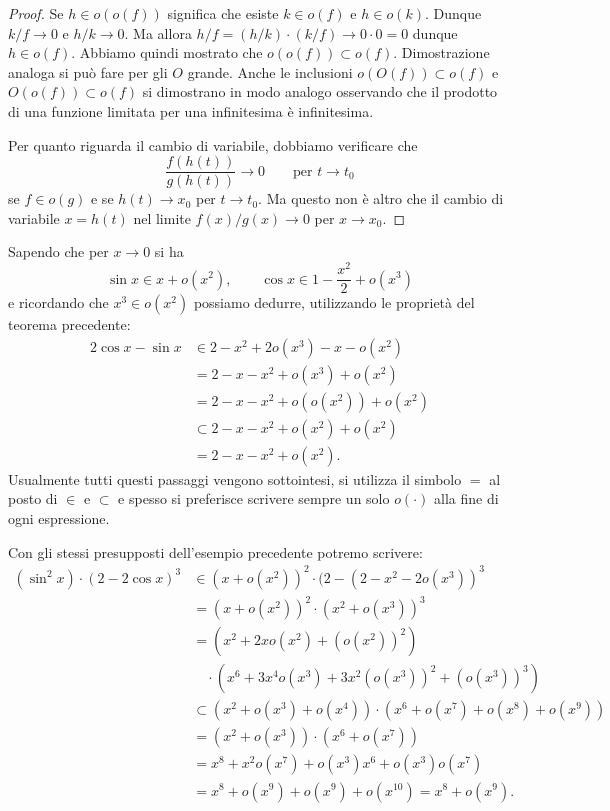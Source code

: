 \begin{proof}
Se $h\in o(o(f))$ significa che esiste $k\in o(f)$ e $h\in o(k)$. Dunque $k/f\to 0 $ e $h/k\to 0$. Ma allora $h/f = (h/k)\cdot (k/f) \to 0\cdot 0 = 0$ dunque $h \in o(f)$. Abbiamo quindi mostrato che $o(o(f)) \subset o(f)$. Dimostrazione analoga si può fare per gli $O$ grande. Anche le inclusioni $o(O(f))\subset o(f)$ e $O(o(f))\subset o(f)$ si dimostrano in modo analogo osservando che il prodotto di una funzione limitata per una infinitesima è infinitesima.

Per quanto riguarda il cambio di variabile, dobbiamo verificare che
\[
  \frac{f(h(t))}{g(h(t))} \to 0
  \qquad\text{per $t\to t_0$}
\]
se $f\in o(g)$ e se $h(t)\to x_0$ per $t \to t_0$. Ma questo non è altro che il cambio di variabile $x=h(t)$ nel limite $f(x)/g(x)\to 0$ per $x\to x_0$.
\end{proof}

\begin{example}
Sapendo che per $x\to 0$ si ha
\[
\sin x \in x + o(x^2), \qquad \cos x \in 1 - \frac {x^2}{2} + o(x^3)
\]
e ricordando che $x^3 \in o (x^2)$ possiamo dedurre, utilizzando le proprietà del teorema precedente:
\begin{align*}
2\cos x  - \sin x
&\in 2 - x^2 + 2o(x^3) - x - o(x^2)\\
&= 2- x - x^2 + o(x^3) + o(x^2)\\
&= 2- x - x^2 + o(o(x^2)) + o(x^2)\\
 &\subset 2 - x - x^2 + o(x^2) + o(x^2)\\
 &= 2-x-x^2 + o(x^2).
\end{align*}
Usualmente tutti questi passaggi vengono sottointesi, si utilizza il simbolo $=$ al posto di $\in$ e $\subset$ e spesso si preferisce scrivere sempre un solo $o(\cdot)$ alla fine di ogni espressione.
\end{example}

\begin{example}
Con gli stessi presupposti dell'esempio precedente potremo
scrivere:
\begin{align*}
(\sin^2 x)\cdot(2-2\cos x)^3
&\in (x+o(x^2))^2 \cdot (2 - (2- x^2 - 2o(x^3))^3 \\
&= (x+o(x^2))^2 \cdot (x^2+o(x^3))^3 \\
&= (x^2 + 2 x o(x^2) + (o(x^2))^2) \\
&\quad \cdot (x^6 + 3 x^4 o(x^3) + 3 x^2(o(x^3))^2 + (o(x^3))^3)\\
&\subset (x^2 + o(x^3) + o(x^4))\cdot(x^6 + o(x^7) + o(x^8) + o(x^9)) \\
&= (x^2 + o(x^3)) \cdot(x^6+o(x^7)) \\
&= x^8 + x^2o(x^7) + o(x^3) x^6 + o(x^3)o(x^7)\\
&= x^8 + o(x^9) + o(x^9) + o(x^{10})
= x^8 + o(x^9).
\end{align*}
\end{example}

